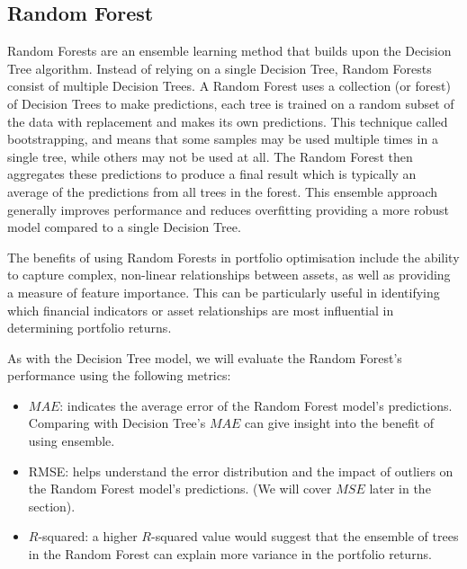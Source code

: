 \documentclass[a4paper,12pt,titlepage]{article}
\numberwithin{equation}{section}
\begin{document}
\subsection{Random Forest}

Random Forests are an ensemble learning method that builds upon the Decision Tree algorithm. 
Instead of relying on a single Decision Tree, Random Forests consist of multiple Decision Trees. 
A Random Forest uses a collection (or forest) of Decision Trees to make predictions, each tree 
is trained on a random subset of the data with replacement and makes its own predictions. This 
technique called bootstrapping, and means that some samples may be used multiple times in a 
single tree, while others may not be used at all. The Random Forest then aggregates these 
predictions to produce a final result which is typically an average of the predictions from all 
trees in the forest. This ensemble approach generally improves performance 
and reduces overfitting providing a more robust model compared to a single 
Decision Tree. \newline \par \noindent The benefits of using Random Forests in portfolio 
optimisation include the ability to capture complex, non-linear relationships between assets, 
as well as providing a measure of feature importance. This can be particularly useful 
in identifying which financial indicators or asset relationships are most influential in 
determining portfolio returns. \newline \par \noindent As with the Decision Tree model, 
we will evaluate the Random Forest's performance using the following metrics:

\begin{itemize}
	
	\item $MAE$: indicates the average error of the Random Forest model's predictions. Comparing 
		with Decision Tree's $MAE$ can give insight into the benefit of using ensemble.
 
	\item RMSE: helps understand the error distribution and the impact of outliers on the Random 
		Forest model's predictions. (We will cover $MSE$ later in the section).

	\item $R$-squared: a higher $R$-squared value would suggest that the ensemble of trees in the 
		Random Forest can explain more variance in the portfolio returns. 

\end{itemize}
\end{document}
